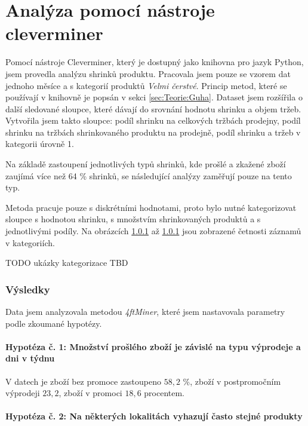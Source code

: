 \chapter{Analýza pomocí nástroje cleverminer}
\label{ch:cleverminer}

Pomocí nástroje Cleverminer, který je dostupný jako knihovna pro jazyk Python, jsem provedla analýzu shrinků produktu. Pracovala jsem pouze se vzorem dat jednoho měsíce a s kategorií produktů \emph{Velmi čerstvé}. Princip metod, které se používají v knihovně je popsán v sekci \ref*{sec:Teorie:Guha}. Dataset jsem rozšířila o další sledované sloupce, které dávají do srovnání hodnotu shrinku a objem tržeb. Vytvořila jsem takto sloupce: podíl shrinku na celkových tržbách prodejny, podíl shrinku na tržbách shrinkovaného produktu na prodejně, podíl shrinku a tržeb v kategorii úrovně 1.

Na základě zastoupení jednotlivých typů shrinků, kde prošlé a zkažené zboží zaujímá více než 64 \% shrinků, se následující analýzy zaměřují pouze na tento typ.

Metoda pracuje pouze s diskrétními hodnotami, proto bylo nutné kategorizovat sloupce s hodnotou shrinku, s množstvím shrinkovaných produktů a s jednotlivými podíly. Na obrázcích \ref*{} až \ref{} jsou zobrazené četnosti záznamů v kategoriích.

TODO ukázky kategorizace TBD %

\subsection{Výsledky}

Data jsem analyzovala metodou \emph{4ftMiner}, které jsem nastavovala parametry podle zkoumané hypotézy. 

\subsubsection*{Hypotéza č. 1: Množství prošlého zboží je závislé na typu výprodeje a dni v týdnu}

V datech je zboží bez promoce zastoupeno $58{,}2$ \%, zboží v postpromočním výprodeji $23{,}2$, zboží v promoci $18{,}6$ procentem.

\subsubsection*{Hypotéza č. 2: Na některých lokalitách vyhazují často stejné produkty}

